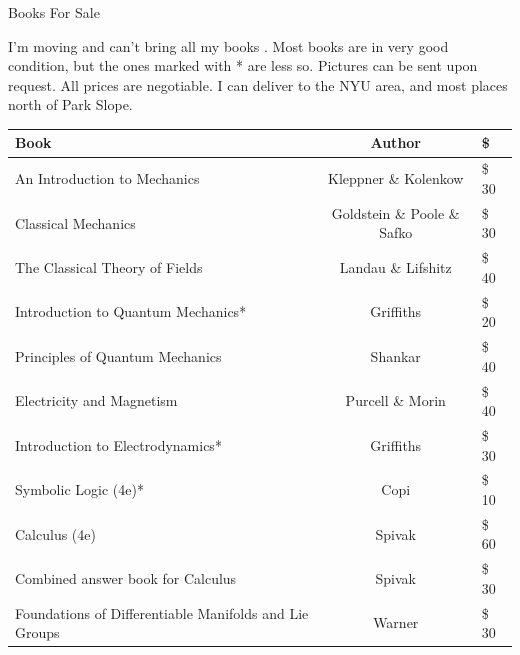 \documentclass[12pt]{article}
\begin{document}
\pagestyle{empty}
\renewcommand{\arraystretch}{1.2}

\begin{center}
    \fontsize{93}{0}\selectfont Books For Sale
\end{center}

\noindent I'm moving and can't bring all my books \frownie{}.
Most books are in very good condition, but the ones marked with * are less so.
Pictures can be sent upon request.
All prices are negotiable.
I can deliver to the NYU area, and most places north of Park Slope.

\begin{center}
    \begin{tabular}{l c >{\$}l}
        Book                                                   & Author                      & \multicolumn{1}{c}{Price} \\ \toprule
        An Introduction to Mechanics                           & Kleppner \& Kolenkow        & 30                        \\
        Classical Mechanics                                    & Goldstein \& Poole \& Safko & 30                        \\
        The Classical Theory of Fields                         & Landau \& Lifshitz          & 40                        \\
        Introduction to Quantum Mechanics*                     & Griffiths                   & 20                        \\
        Principles of Quantum Mechanics                        & Shankar                     & 40                        \\
        Electricity and Magnetism                              & Purcell \& Morin            & 40                        \\
        Introduction to Electrodynamics*                       & Griffiths                   & 30                        \\
        Symbolic Logic (4e)*                                   & Copi                        & 10                        \\
        Calculus (4e)                                          & Spivak                      & 60                        \\
        Combined answer book for Calculus                      & Spivak                      & 30                        \\
        Foundations of Differentiable Manifolds and Lie Groups & Warner                      & 30                        \\

\end{tabular}
\end{center}
\end{document}
